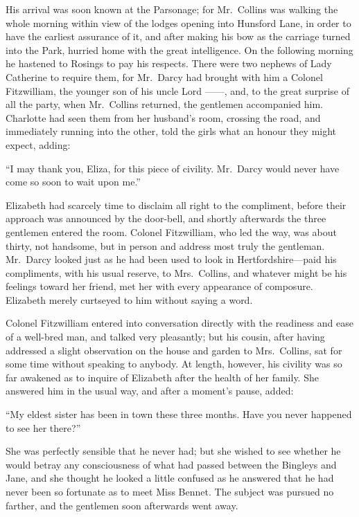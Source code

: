 \documentclass[12pt,english]{book}
\begin{document}
His arrival was soon known at the Parsonage; for Mr.\ Collins was
walking the whole morning within view of the lodges opening into Hunsford
Lane, in order to have the earliest assurance of it, and after making
his bow as the carriage turned into the Park, hurried home with the
great intelligence. On the following morning he hastened to Rosings
to pay his respects. There were two nephews of Lady Catherine to require
them, for Mr.\ Darcy had brought with him a Colonel Fitzwilliam,
the younger son of his uncle Lord \mbox{------}, and, to the great
surprise of all the party, when Mr.\ Collins returned, the gentlemen
accompanied him. Charlotte had seen them from her husband's room,
crossing the road, and immediately running into the other, told the
girls what an honour they might expect, adding:

{}``I may thank you, Eliza, for this piece of civility. Mr.\ Darcy
would never have come so soon to wait upon me.''

Elizabeth had scarcely time to disclaim all right to the compliment,
before their approach was announced by the door-bell, and shortly
afterwards the three gentlemen entered the room. Colonel Fitzwilliam,
who led the way, was about thirty, not handsome, but in person and
address most truly the gentleman. Mr.\ Darcy looked just as he had
been used to look in Hertfordshire\mbox{---}paid his compliments,
with his usual reserve, to Mrs.\ Collins, and whatever might be his
feelings toward her friend, met her with every appearance of composure.
Elizabeth merely curtseyed to him without saying a word.

Colonel Fitzwilliam entered into conversation directly with the readiness
and ease of a well-bred man, and talked very pleasantly; but his cousin,
after having addressed a slight observation on the house and garden
to Mrs.\ Collins, sat for some time without speaking to anybody.
At length, however, his civility was so far awakened as to inquire
of Elizabeth after the health of her family. She answered him in the
usual way, and after a moment's pause, added:

{}``My eldest sister has been in town these three months. Have you
never happened to see her there?''\ 

She was perfectly sensible that he never had; but she wished to see
whether he would betray any consciousness of what had passed between
the Bingleys and Jane, and she thought he looked a little confused
as he answered that he had never been so fortunate as to meet Miss
Bennet. The subject was pursued no farther, and the gentlemen soon
afterwards went away.
\end{document}
